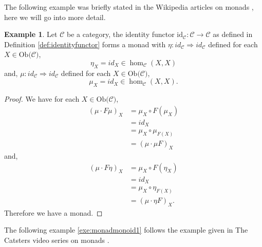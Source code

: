 \documentclass[11pt,a4paper]{article}
\theoremstyle{definition}
\newtheorem{example}[thm]{Example}
\newcommand\ho[3][]{\hom_{#1}(#2,#3)}
\newcommand\ob[1]{\mathrm{Ob(}#1\mathrm{)}}
\newcommand\cat[1]{\mathscr{#1}}
\newcommand\func[3]{\mathrm{#1}\colon#2\rightarrow#3}
\newcommand\nattran[3]{#1\colon#2\Rightarrow#3}
\numberwithin{equation}{section}
\begin{document}
The following example was briefly stated in the Wikipedia articles on monads \cite{wiki:monad}, here we will go into more detail.
\begin{example}
    \label{exe:identitymonad}
    Let $\cat{C}$ be a category, the identity functor $\func{id_{\cat{C}}}{\cat{C}}{\cat{C}}$ as defined in Definition \ref{def:identityfunctor} forms a monad with $\nattran{\eta}{id_{\cat{C}}}{id_{\cat{C}}}$ defined for each $X\in\ob{\cat{C}}$,
    \[\eta_{X} = id_{X}\in\ho[\cat{C}]{X}{X}\]
    and, $\nattran{\mu}{id_{\cat{C}}}{id_{\cat{C}}}$ defined for each $X\in\ob{\cat{C}}$,
    \[\mu_{X} = id_{X}\in\ho[\cat{C}]{X}{X}.\]
\end{example} 
\begin{proof}
We have for each $X\in\ob{\cat{C}}$,
\begin{align*}
(\mu \cdot F\mu)_X &= \mu_X \circ F(\mu_{X}) \\
&= id_X \\
&= \mu_X \circ \mu_{F(X)} \\
&= (\mu \cdot \mu F)_X
\end{align*}
and,
\begin{align*}
    (\mu \cdot F\eta)_X &= \mu_X \circ F(\eta_{X}) \\
    &= id_X\\
    &= \mu_{X} \circ \eta_{F(X)} \\ 
    &= (\mu \cdot \eta F)_X.
\end{align*}
Therefore we have a monad.
\end{proof}
The following example \ref{exe:monadmonoid1} follows the example given in The Catsters video series on monads \cite{catsters:mon}.
\end{document}
